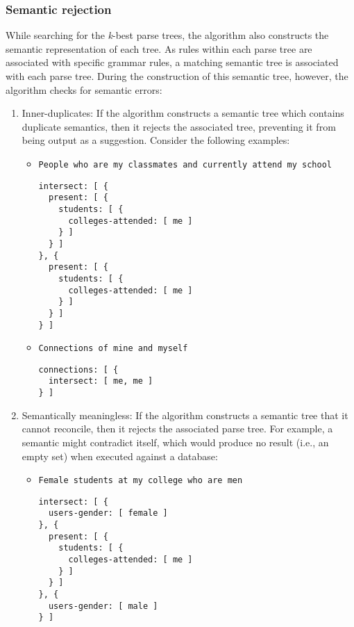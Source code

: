 \documentclass{article}
\begin{document}
\subsubsection{Semantic rejection}
While searching for the \textit{k}-best parse trees, the algorithm also constructs the semantic representation of each tree. As rules within each parse tree are associated with specific grammar rules, a matching semantic tree is associated with each parse tree. During the construction of this semantic tree, however, the algorithm checks for semantic errors:
\begin{enumerate}
\item Inner-duplicates: If the algorithm constructs a semantic tree which contains duplicate semantics, then it rejects the associated tree, preventing it from being output as a suggestion. Consider the following examples:
\begin{itemize}
\newpage
\item \texttt{People who are my classmates and currently attend my school}
\begin{verbatim}
intersect: [ {
  present: [ {
    students: [ {
      colleges-attended: [ me ]
    } ]
  } ]
}, {
  present: [ {
    students: [ {
      colleges-attended: [ me ]
    } ]
  } ]
} ]
\end{verbatim}
\item \texttt{Connections of mine and myself}
\begin{verbatim}
connections: [ {
  intersect: [ me, me ]
} ]
\end{verbatim}
\end{itemize}
\item Semantically meaningless: If the algorithm constructs a semantic tree that it cannot reconcile, then it rejects the associated parse tree. For example, a semantic might contradict itself, which would produce no result (i.e., an empty set) when executed against a database:
\begin{itemize}
\item \texttt{Female students at my college who are men}
\begin{verbatim}
intersect: [ {
  users-gender: [ female ]
}, {
  present: [ {
    students: [ {
      colleges-attended: [ me ]
    } ]
  } ]
}, {
  users-gender: [ male ]
} ]
\end{verbatim}
\end{itemize}
\end{enumerate}
\end{document}
